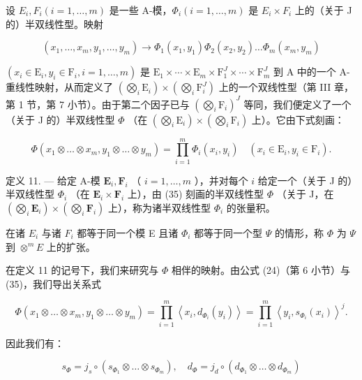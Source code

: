 设 \(E_{i}, F_{i} (i = 1, \ldots, m)\) 是一些 A-模，\(\Phi_{i} (i = 1, \ldots, m)\) 是 \(E_{i} \times F_{i}\) 上的（关于 J 的）半双线性型。映射

\[
(x _ {1}, \dots , x _ {m}, y _ {1}, \dots , y _ {m}) \rightarrow \Phi_ {1} (x _ {1}, y _ {1}) \Phi_ {2} (x _ {2}, y _ {2}) \dots \Phi_ {m} (x _ {m}, y _ {m})
\]

\((x_{i} \in \mathrm{E}_{i}, y_{i} \in \mathrm{F}_{i}, i = 1, \ldots, m)\) 是 \(\mathrm{E}_{1} \times \cdots \times \mathrm{E}_{m} \times \mathrm{F}_{1}^{J} \times \cdots \times \mathrm{F}_{m}^{J}\) 到 A 中的一个 A-重线性映射，从而定义了 \((\bigotimes_{i} \mathrm{E}_{i}) \times (\bigotimes_{i} \mathrm{F}_{i}^{J})\) 上的一个双线性型（第 III 章，第 1 节，第 7 小节）。由于第二个因子已与 \((\bigotimes_{i} \mathrm{F}_{i})^{J}\) 等同，我们便定义了一个（关于 J 的）半双线性型 \(\Phi\) （在 \((\bigotimes_{i} \mathrm{E}_{i}) \times (\bigotimes_{i} \mathrm{F}_{i})\) 上）。它由下式刻画：

\[
\Phi (x _ {1} \otimes \dots \otimes x _ {m}, y _ {1} \otimes \dots \otimes y _ {m}) = \prod_ {i = 1} ^ {m} \Phi_ {i} (x _ {i}, y _ {i}) \quad (x _ {i} \in \mathrm{E} _ {i}, y _ {i} \in \mathrm{F} _ {i}).\tag{35}
\]

定义 11. --- 给定 A-模 \(\mathbf{E}_{i}, \mathbf{F}_{i}\) （ \(i=1,\ldots,m\) ），并对每个 \(i\) 给定一个（关于 J 的）半双线性型 \(\Phi_{i}\) （在 \(\mathbf{E}_{i} \times \mathbf{F}_{i}\) 上），由 (35) 刻画的半双线性型 \(\Phi\) （关于 J，在 \((\bigotimes_{i}\mathbf{E}_{i}) \times (\bigotimes_{i}\mathbf{F}_{i})\) 上），称为诸半双线性型 \(\Phi_{i}\) 的张量积。

在诸 \(E_{i}\) 与诸 \(F_{i}\) 都等于同一个模 E 且诸 \(\Phi_{i}\) 都等于同一个型 \(\Psi\) 的情形，称 \(\Phi\) 为 \(\Psi\) 到 \(\otimes^{m}E\) 上的扩张。

在定义 11 的记号下，我们来研究与 \(\Phi\) 相伴的映射。由公式 (24)（第 6 小节）与 (35)，我们导出关系式

\[
\Phi (x _ {1} \otimes \dots \otimes x _ {m}, y _ {1} \otimes \dots \otimes y _ {m}) = \prod_ {i = 1} ^ {m} \left\langle x _ {i}, d _ {\Phi_ {i}} (y _ {i}) \right\rangle = \prod_ {i = 1} ^ {m} \left\langle y _ {i}, s _ {\Phi_ {i}} (x _ {i}) \right\rangle^ {j}.
\]

因此我们有：

\[
s _ {\Phi} = j _ {s} \circ (s _ {\Phi_ {1}} \otimes \dots \otimes s _ {\Phi_ {m}}), \quad d _ {\Phi} = j _ {d} \circ (d _ {\Phi_ {1}} \otimes \dots \otimes d _ {\Phi_ {m}})\tag{36}
\]


